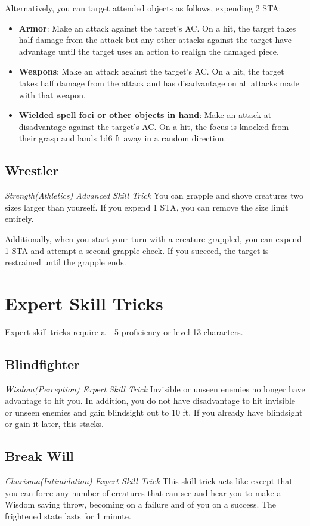 Alternatively, you can target attended objects as follows, expending 2 STA:
\begin{itemize}
	\item \textbf{Armor}: Make an attack against the target's AC. On a hit, the target takes half damage from the attack but any other attacks against the target have advantage until the target uses an action to realign the damaged piece.
	\item \textbf{Weapons}: Make an attack against the target's AC. On a hit, the target takes half damage from the attack and has disadvantage on all attacks made with that weapon.
	\item \textbf{Wielded spell foci or other objects in hand}: Make an attack at disadvantage against the target's AC. On a hit, the focus is knocked from their grasp and lands 1d6  ft away in a random direction.
\end{itemize}

\subsection{Wrestler}
\textit{Strength(Athletics) Advanced Skill Trick}
You can grapple and shove creatures two sizes larger than yourself. If you expend 1 STA, you can remove the size limit entirely.

Additionally, when you start your turn with a creature grappled, you can expend 1 STA and attempt a second grapple check. If you succeed, the target is restrained until the grapple ends.

\section{Expert Skill Tricks}
\label{sec:skill-tricks-expert}

Expert skill tricks require a +5 proficiency or level 13 characters.

\subsection{Blindfighter}
\textit{Wisdom(Perception) Expert Skill Trick}
Invisible or unseen enemies no longer have advantage to hit you. In addition, you do not have disadvantage to hit invisible or unseen enemies and gain blindsight out to 10 ft. If you already have blindsight or gain it later, this stacks.

\subsection{Break Will}
\textit{Charisma(Intimidation) Expert Skill Trick}
This skill trick acts like  except that you can force any number of creatures that can see and hear you to make a Wisdom saving throw, becoming  on a failure and  of you on a success. The frightened state lasts for 1 minute.

